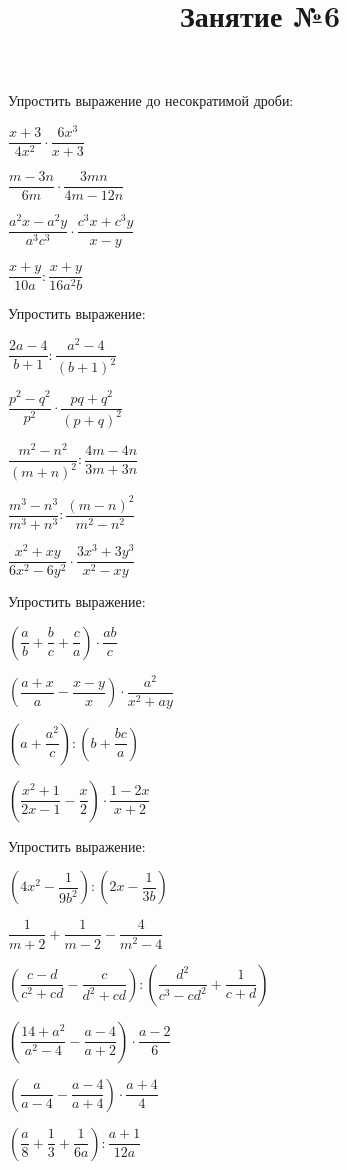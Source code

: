 \newpage
\title{Занятие №6}
\begin{listofex}
	\item Упростить выражение до несократимой дроби:
	\begin{enumcols}[itemcolumns=3]
		\item \( \dfrac{x+3}{4x^2}\cdot\dfrac{6x^3}{x+3} \)
		\item \( \dfrac{m-3n}{6m}\cdot\dfrac{3mn}{4m-12n} \)
		\item \( \dfrac{a^2x-a^2y}{a^3c^3}\cdot\dfrac{c^3x+c^3y}{x-y} \)
		\item \( \dfrac{x+y}{10a}:\dfrac{x+y}{16a^2b} \)
	\end{enumcols}
	\item Упростить выражение:
	\begin{enumcols}[itemcolumns=3]
		\item \( \dfrac{2a-4}{b+1}:\dfrac{a^2-4}{(b+1)^2} \)
		\item \( \dfrac{p^2-q^2}{p^2}\cdot\dfrac{pq+q^2}{(p+q)^2} \)
		\item \( \dfrac{m^2-n^2}{(m+n)^2}:\dfrac{4m-4n}{3m+3n} \)
		\item \( \dfrac{m^3-n^3}{m^3+n^3}:\dfrac{(m-n)^2}{m^2-n^2} \)
		\item \( \dfrac{x^2+xy}{6x^2-6y^2}\cdot\dfrac{3x^3+3y^3}{x^2-xy} \)
	\end{enumcols}
	\item Упростить выражение:
	\begin{enumcols}[itemcolumns=2]
		\item \( \left( \dfrac{a}{b}+\dfrac{b}{c}+\dfrac{c}{a} \right)\cdot\dfrac{ab}{c} \)
		\item \( \left( \dfrac{a+x}{a}-\dfrac{x-y}{x} \right)\cdot\dfrac{a^2}{x^2+ay} \)
		\item \( \left( a+\dfrac{a^2}{c} \right):\left( b+\dfrac{bc}{a} \right) \)
		\item \( \left( \dfrac{x^2+1}{2x-1}-\dfrac{x}{2} \right)\cdot\dfrac{1-2x}{x+2} \)
	\end{enumcols}
	\item Упростить выражение:
	\begin{enumcols}[itemcolumns=2]
		\item \( \left( 4x^2-\dfrac{1}{9b^2} \right):\left( 2x-\dfrac{1}{3b} \right) \)
		\item \( \dfrac{1}{m+2}+\dfrac{1}{m-2}-\dfrac{4}{m^2-4} \)
		\item \( \left( \dfrac{c-d}{c^2+cd}-\dfrac{c}{d^2+cd} \right):\left( \dfrac{d^2}{c^3-cd^2}+\dfrac{1}{c+d} \right) \)
		\item \( \left( \dfrac{14+a^2}{a^2-4}-\dfrac{a-4}{a+2} \right)\cdot\dfrac{a-2}{6} \)
		\item \( \left( \dfrac{a}{a-4}-\dfrac{a-4}{a+4} \right)\cdot\dfrac{a+4}{4} \)
		\item \( \left( \dfrac{a}{8}+\dfrac{1}{3}+\dfrac{1}{6a} \right):\dfrac{a+1}{12a} \)
	\end{enumcols}
\end{listofex}
